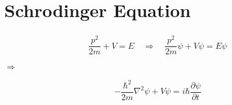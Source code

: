 \section{Schrodinger Equation}

\begin{equation*}
  \begin{aligned}
    \dfrac{p^2}{2 m} + V = E \quad \Rightarrow \quad \dfrac{p^2}{2 m} \psi + V \psi = E \psi
  \end{aligned}
\end{equation*}

$\Rightarrow$

\begin{equation}
  \begin{aligned}
    - \dfrac{\hbar^2}{2 m} \nabla^2 \psi + V \psi = i \hbar \dfrac{\partial \psi}{\partial t}  
  \end{aligned}
\end{equation}


